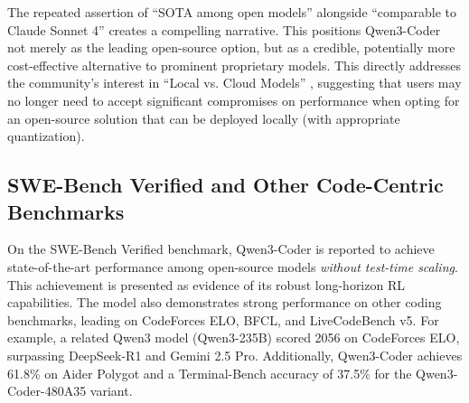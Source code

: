 The repeated assertion of ``SOTA among open models'' alongside ``comparable to Claude Sonnet 4'' creates a compelling narrative.\cite{qwenlm_qwen3coder_blog_2025, llmstats_claude_qwen3_2025, gupta_qwen3coder_medium_2025, ainvest_qwen3coder_2025, github_qwenlm_qwen3coder_2025, reddit_localllama_qwen3coder_2_2025, investing_qwen3coder_2025, reddit_localllama_qwen3coder_3_2025, marktechpost_qwen3coder_2025, youtube_qwen3coder_leading_2025, willison_qwen3coder_2025} This positions Qwen3-Coder not merely as the leading open-source option, but as a credible, potentially more cost-effective alternative to prominent proprietary models. This directly addresses the community's interest in ``Local vs. Cloud Models'' \cite{hackernews_qwen3coder_2025}, suggesting that users may no longer need to accept significant compromises on performance when opting for an open-source solution that can be deployed locally (with appropriate quantization).

\subsection{SWE-Bench Verified and Other Code-Centric Benchmarks}

On the SWE-Bench Verified benchmark, Qwen3-Coder is reported to achieve state-of-the-art performance among open-source models \textit{without test-time scaling}.\cite{fortuneindia_qwen3coder_2025, qwenlm_qwen3coder_blog_2025, svenson_qwen3coder_medium_2025, apidog_qwen3coder_2025, investing_qwen3coder_2025, reddit_localllama_qwen3coder_3_2025, marktechpost_qwen3coder_2025, youtube_qwen3coder_leading_2025, willison_qwen3coder_2025} This achievement is presented as evidence of its robust long-horizon RL capabilities.\cite{qwenlm_qwen3coder_blog_2025} The model also demonstrates strong performance on other coding benchmarks, leading on CodeForces ELO, BFCL, and LiveCodeBench v5.\cite{svenson_qwen3coder_medium_2025, apidog_qwen3coder_2025, datacamp_qwen3_features_2025} For example, a related Qwen3 model (Qwen3-235B) scored 2056 on CodeForces ELO, surpassing DeepSeek-R1 and Gemini 2.5 Pro.\cite{datacamp_qwen3_features_2025} Additionally, Qwen3-Coder achieves 61.8\% on Aider Polygot \cite{unsloth_qwen3coder_local_2025} and a Terminal-Bench accuracy of 37.5\% for the Qwen3-Coder-480A35 variant.\cite{github_qwenlm_qwencode_2025}


